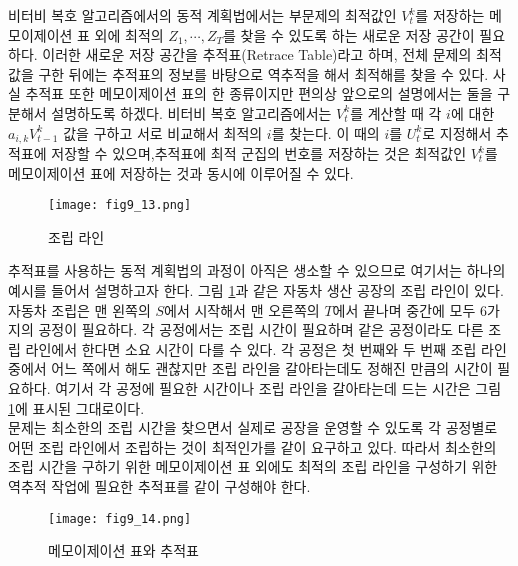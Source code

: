 \documentclass[a4paper]{oblivoir}
\begin{document}
비터비 복호 알고리즘에서의 동적 계획법에서는 부문제의 최적값인 $V_{t}^{k}$를 저장하는 메모이제이션 표 외에 최적의 $Z_1,\cdots,Z_{T}$를 찾을 수 있도록 하는 새로운 저장 공간이 필요하다. 이러한 새로운 저장 공간을 추적표(Retrace Table)라고 하며, 전체 문제의 최적값을 구한  뒤에는 추적표의 정보를 바탕으로 역추적을 해서 최적해를 찾을 수 있다. 사실 추적표 또한 메모이제이션 표의 한 종류이지만 편의상 앞으로의 설명에서는 둘을 구분해서 설명하도록 하겠다. 비터비 복호 알고리즘에서는 $V_{t}^{k}$를 계산할 때 각 $i$에 대한 $a_{i,k} V_{t-1}^{k}$ 값을 구하고 서로 비교해서 최적의 $i$를 찾는다. 이 때의 $i$를 $U_{t}^{k}$로 지정해서 추적표에 저장할 수 있으며,추적표에 최적 군집의 번호를 저장하는 것은 최적값인 $V_{t}^{k}$를 메모이제이션 표에 저장하는 것과 동시에 이루어질 수 있다. \\ 

\begin{figure}[ht] \centering 
\texttt{[image: fig9\_13.png]} 
\caption{조립 라인}
\label{fig:9-14}
\end{figure}

추적표를 사용하는 동적 계획법의 과정이 아직은 생소할 수 있으므로 여기서는 하나의 예시를 들어서 설명하고자 한다. 그림 \ref{fig:9-14}과 같은 자동차 생산 공장의 조립 라인이 있다. 자동차 조립은 맨 왼쪽의 $S$에서 시작해서 맨 오른쪽의 $T$에서 끝나며 중간에 모두 6가지의 공정이 필요하다. 각 공정에서는 조립 시간이 필요하며 같은 공정이라도 다른 조립 라인에서 한다면 소요 시간이 다를 수 있다. 각 공정은 첫 번째와 두 번째 조립 라인 중에서 어느 쪽에서 해도 괜찮지만 조립 라인을 갈아타는데도 정해진 만큼의 시간이 필요하다. 여기서 각 공정에 필요한 시간이나 조립 라인을 갈아타는데 드는 시간은 그림 \ref{fig:9-14}에 표시된 그대로이다.\\

문제는 최소한의 조립 시간을 찾으면서 실제로 공장을 운영할 수 있도록 각 공정별로 어떤 조립 라인에서 조립하는 것이 최적인가를 같이 요구하고 있다. 따라서 최소한의 조립 시간을 구하기 위한 메모이제이션 표 외에도 최적의 조립 라인을 구성하기 위한 역추적 작업에 필요한 추적표를 같이 구성해야 한다. \\

\begin{figure}[ht] \centering 
\texttt{[image: fig9\_14.png]} 
\caption{메모이제이션 표와 추적표}
\label{fig:9-15}
\end{figure}
\end{document}
